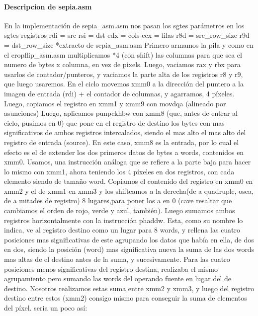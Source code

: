 \documentclass[a4paper]{article}
\begin{document}
         
\paragraph{\textbf{Descripcion de sepia.asm}}
\hfill \break
        En la implementación de sepia_asm.asm nos pasan los sgtes parámetros en los sgtes registros
\hfill \break
        rdi = src
        \hfill \break
    rsi = dst
    \hfill \break
    edx = cols
    \hfill \break
    ecx = filas
    \hfill \break
    r8d = src_row_size
    \hfill \break    
    r9d = dst_row_size
    \hfill \break
 *extracto de sepia_asm.asm
  \hfill \break
  Primero armamos la pila y como en el cropflip_asm.asm multiplicamos  *4 (con shift) las columnas para que sea el numero de bytes x columna, en vez de pixels.
  Luego, vaciamos rax y rbx para usarlos de contador/punteros, y vaciamos la parte alta de los registros r8 y r9, que luego usaremos. 
  \hfill \break
   En el ciclo movemos xmm0 a la dirección del puntero a la imagen de entrada (rdi) + el contador de columnas, y agarramos, 4 píxeles. Luego, copiamos el registro en xmm1 y xmm9 con movdqa (alineado por asunciones)
   \hfill \break
   Luego, aplicamos punpckhbw con xmm8 (que, antes de entrar al ciclo, pusimos en 0) que pone en el registro de destino los bytes con mas significativos de ambos registros intercalados, siendo el mas alto el mas alto del registro de entrada (source). En este caso, xmm8 es la entrada, por lo cual el efecto es el de extender los dos primeros datos de bytes a words, contenidos en xmm0. Usamos, una instrucción análoga que se refiere a la parte baja para hacer lo mismo con xmm1, ahora teniendo los 4 píxeles en dos registros, con cada elemento siendo de tamaño word.
   \hfill \break
   Copiamos el contenido del registro en  xmm0 en xmm2 y el de xmm1 en xmm3 y los shifteamos a la derecha(de a quadruple, osea, de a mitades de registro) 8 lugares,para poner los a en 0 (cave resaltar que cambiamos el orden de rojo, verde y azul, también).
   \hfill \break
   Luego sumamos ambos registros horizontalmente con la instrucción phaddw. Esta, como su nombre lo indica, ve al registro destino como un lugar para 8 words, y rellena las cuatro posiciones mas significativas de este agrupando los datos que había en ella, de dos en dos, siendo la posición (word)  mas significativa nueva la suma de las dos words mas altas de el destino antes de la suma, y sucesivamente. Para las cuatro posiciones menos significativas del registro destina,  realizaba el mismo agrupamiento pero sumando las words del operando fuente en lugar del de destino. Nosotros realizamos estas suma entre xmm2 y xmm3, y luego del registro destino entre estos (xmm2) consigo mismo para conseguir la suma de elementos del píxel. seria un poco así:
   \hfill \break
   
\end{document}
